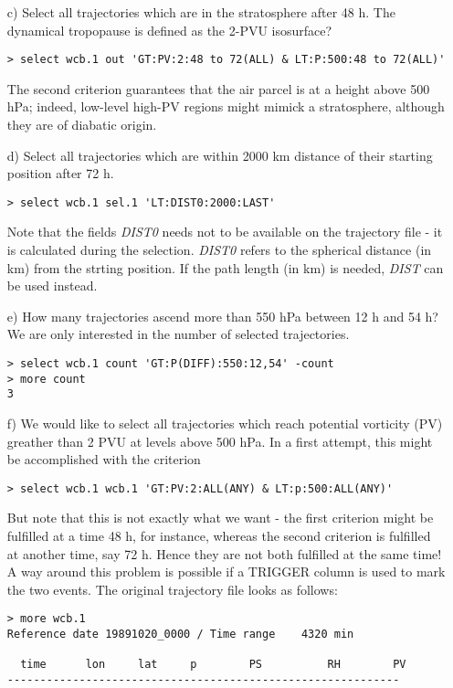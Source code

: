 \documentclass[a4paper,10pt]{article}
\begin{document}
\begin{itemize}
\item[c)] Select all trajectories which are in the stratosphere after 48 h. The dynamical tropopause is defined as the 2-PVU isosurface?
\begin{verbatim}
> select wcb.1 out 'GT:PV:2:48 to 72(ALL) & LT:P:500:48 to 72(ALL)' 
\end{verbatim}
The second criterion guarantees that the air parcel is at a height above 500 hPa; indeed, low-level high-PV regions might mimick a stratosphere, although they are of diabatic origin.  

\item[d)] Select all trajectories which are within 2000 km distance of their starting position after 72 h.
\begin{verbatim}
> select wcb.1 sel.1 'LT:DIST0:2000:LAST'
\end{verbatim}
Note that the fields {\em DIST0} needs not to be available on the trajectory file - it is calculated during the selection. {\em DIST0} refers to the spherical distance (in km) from the strting position. If the path length (in km) is needed, {\em DIST} can be used instead.

\item[e)] How many trajectories ascend more than 550 hPa between 12 h and 54 h? We are only interested in the number of selected trajectories.
\begin{verbatim}
> select wcb.1 count 'GT:P(DIFF):550:12,54' -count
> more count
3
\end{verbatim}

\item[f)] We would like to select all trajectories which reach potential vorticity (PV) greather than 2 PVU at levels above 500 hPa. In a first attempt, this might be accomplished with the criterion
\begin{verbatim}
> select wcb.1 wcb.1 'GT:PV:2:ALL(ANY) & LT:p:500:ALL(ANY)' 
\end{verbatim} 
But note that this is not exactly what we want - the first criterion might be fulfilled at a time 48 h, for instance, whereas the second criterion is fulfilled at another time, say 72 h. Hence they are not both fulfilled at the same time! A way around this problem is possible if a TRIGGER column is used to mark the two events. The original trajectory file looks as follows:
\begin{verbatim}
> more wcb.1
Reference date 19891020_0000 / Time range    4320 min

  time      lon     lat     p        PS          RH        PV
------------------------------------------------------------


\end{verbatim}
\end{itemize}
\end{document}
